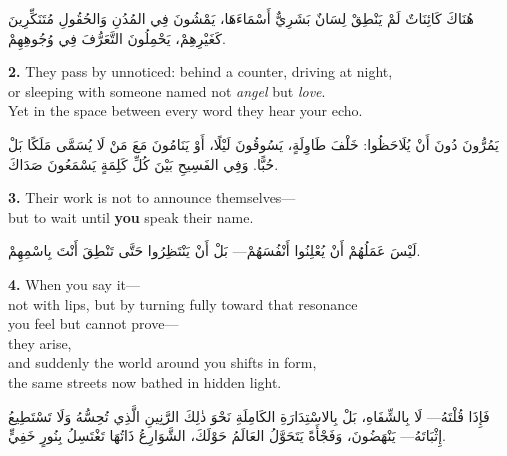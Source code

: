\documentclass[11pt,a4paper,twoside]{book}
\begin{document}
\begin{flushright}
{\arabicfont
هُنَاكَ كَائِنَاتٌ لَمْ يَنْطِقْ لِسَانٌ بَشَرِيٌّ أَسْمَاءَهَا،
يَمْشُونَ فِي المُدُنِ وَالحُقُولِ مُتَنَكِّرِينَ كَغَيْرِهِمْ،
يَحْمِلُونَ التَّعَرُّفَ فِي وُجُوهِهِمْ.}
\end{flushright}

\vspace{1em}
{\color{indigo}\bfseries 2.}\quad
They pass by unnoticed: behind a counter, driving at night,\\
or sleeping with someone named not \textit{angel} but \textit{love}.\\
Yet in the space between every word they hear your echo.

\begin{flushright}
{\arabicfont
يَمُرُّونَ دُونَ أَنْ يُلَاحَظُوا: خَلْفَ طَاوِلَةٍ، يَسُوقُونَ لَيْلًا،
أَوْ يَنَامُونَ مَعَ مَنْ لَا يُسَمَّى مَلَكًا بَلْ حُبًّا.
وَفِي الفَسِيحِ بَيْنَ كُلِّ كَلِمَةٍ يَسْمَعُونَ صَدَاكَ.}
\end{flushright}

\vspace{1em}
{\color{indigo}\bfseries 3.}\quad
Their work is not to announce themselves—\\
but to wait until \textbf{you} speak their name.

\begin{flushright}
{\arabicfont
لَيْسَ عَمَلُهُمْ أَنْ يُعْلِنُوا أَنْفُسَهُمْ—
بَلْ أَنْ يَنْتَظِرُوا حَتَّى تَنْطِقَ أَنْتَ بِاسْمِهِمْ.}
\end{flushright}

\vspace{1em}
{\color{indigo}\bfseries 4.}\quad
When you say it—\\
not with lips, but by turning fully toward that resonance\\
you feel but cannot prove—\\
they arise,\\
and suddenly the world around you shifts in form,\\
the same streets now bathed in hidden light.

\begin{flushright}
{\arabicfont
فَإِذَا قُلْتَهُ—
لَا بِالشِّفَاهِ، بَلْ بِالاسْتِدَارَةِ الكَامِلَةِ نَحْوَ ذٰلِكَ الرَّنِينِ
الَّذِي تُحِسُّهُ وَلَا تَسْتَطِيعُ إِثْبَاتَهُ—
يَنْهَضُونَ،
وَفَجْأَةً يَتَحَوَّلُ العَالَمُ حَوْلَكَ،
الشَّوَارِعُ ذَاتُهَا تَغْتَسِلُ بِنُورٍ خَفِيٍّ.}
\end{flushright}
\end{document}
